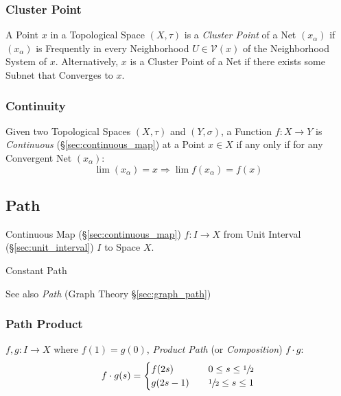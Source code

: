 \subsubsection{Cluster Point}\label{sec:cluster_point}

A Point $x$ in a Topological Space $(X,\tau)$ is a \emph{Cluster
  Point} of a Net $(x_\alpha)$ if $(x_\alpha)$ is Frequently in every
Neighborhood $U \in \mathcal{V}(x)$ of the Neighborhood System of $x$.
Alternatively, $x$ is a Cluster Point of a Net if there exists some
Subnet that Converges to $x$.



\subsubsection{Continuity}\label{sec:net_continuity}

Given two Topological Spaces $(X,\tau)$ and $(Y,\sigma)$, a Function
$f : X \rightarrow Y$ is \emph{Continuous}
(\S\ref{sec:continuous_map}) at a Point $x \in X$ if any only if for
any Convergent Net $(x_\alpha)$:
\[
  \lim (x_\alpha) = x \Rightarrow \lim f(x_\alpha) = f(x)
\]



\subsection{Path}\label{sec:path} \cite{hatcher02}

Continuous Map (\S\ref{sec:continuous_map}) $f : I \rightarrow X$ from
Unit Interval (\S\ref{sec:unit_interval}) $I$ to Space $X$.

Constant Path %

\fist See also \emph{Path} (Graph Theory \S\ref{sec:graph_path})



\subsubsection{Path Product}\label{sec:path_product}

$f,g : I \rightarrow X$ where $f(1) = g(0)$, \emph{Product Path} (or
\emph{Composition}) $f \cdot g$:
\[
  f \cdot g (s) =
  \begin{cases}
    f(2s)   & \quad 0 \leq s \leq \sfrac{1}{2} \\
    g(2s-1) & \quad \sfrac{1}{2} \leq s \leq 1 \\
  \end{cases}
\]



